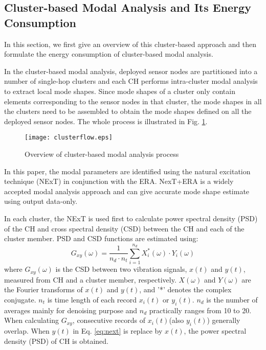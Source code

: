 \subsection{Cluster-based Modal Analysis and Its Energy Consumption}
In this section, we first give an overview of this cluster-based approach and then formulate the energy consumption of cluster-based modal analysis.

In the cluster-based modal analysis, deployed sensor nodes are partitioned into a number of single-hop clusters and each CH performs intra-cluster modal analysis to extract local mode shapes. Since mode shapes of a cluster only contain elements corresponding to the sensor nodes in that cluster, the mode shapes in all the clusters need to be assembled to obtain the mode shapes defined on all the deployed sensor nodes. The whole process is illustrated in Fig. \ref{fig:clusterflow}.

\begin{figure}
	\centering
		\texttt{[image: clusterflow.eps]}
	\caption{Overview of cluster-based modal analysis process}
	\label{fig:clusterflow}
\end{figure}

In this paper, the modal parameters are identified using the natural excitation technique (NExT)\cite{james1993natural} in conjunction with the ERA. NexT+ERA is a widely accepted modal analysis approach and can give accurate mode shape estimate using output data-only. 

In each cluster, the NExT is used first to calculate power spectral density (PSD) of the CH and cross spectral density (CSD) between the CH and each of the cluster member. PSD and CSD functions are estimated using:
\begin{equation}
G_{xy}(\omega)=\frac{1}{n_d\cdot n_t}\sum\limits_{i=1}^{n_d}X_i^*(\omega)\cdot Y_i(\omega) \label{eq:next}
\end{equation}
where \(G_{xy}(\omega)\) is the CSD between two vibration signals, \(x(t)\) and \(y(t)\), measured from CH and a cluster member, respectively. \(X(\omega)\) and \(Y(\omega)\) are the Fourier transforms of \(x(t)\) and \(y(t)\), and '*' denotes the complex conjugate. \(n_t\) is time length of each record \(x_i(t)\) or \(y_i(t)\). \(n_d\) is the number of averages mainly for denoising purpose and \(n_d\) practically ranges from 10 to 20. When calculating \(G_{xy}\), consecutive records of \(x_i(t)\)(also \(y_i(t)\)) generally overlap. When \(y(t)\) in Eq. \ref{eq:next} is replace by \(x(t)\), the power spectral density (PSD) of CH is obtained. 

